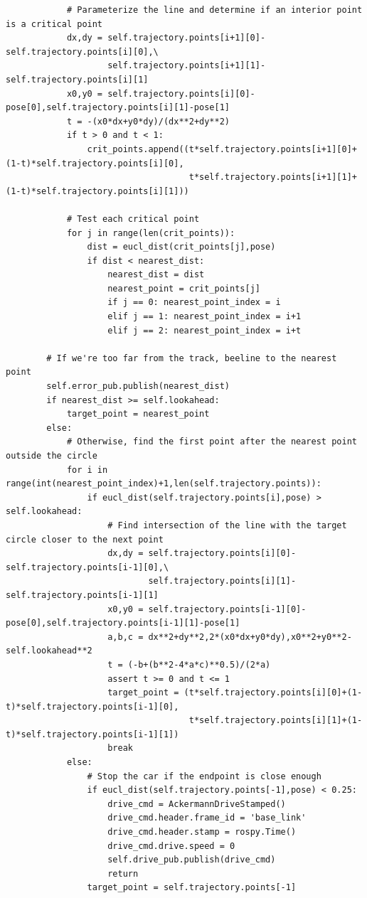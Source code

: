 \documentclass{article}
\begin{document}
{\begin{verbatim}
            # Parameterize the line and determine if an interior point is a critical point
            dx,dy = self.trajectory.points[i+1][0]-self.trajectory.points[i][0],\
                    self.trajectory.points[i+1][1]-self.trajectory.points[i][1]
            x0,y0 = self.trajectory.points[i][0]-pose[0],self.trajectory.points[i][1]-pose[1]
            t = -(x0*dx+y0*dy)/(dx**2+dy**2)
            if t > 0 and t < 1:
                crit_points.append((t*self.trajectory.points[i+1][0]+(1-t)*self.trajectory.points[i][0],
                                    t*self.trajectory.points[i+1][1]+(1-t)*self.trajectory.points[i][1]))
            
            # Test each critical point
            for j in range(len(crit_points)):
                dist = eucl_dist(crit_points[j],pose)
                if dist < nearest_dist:
                    nearest_dist = dist
                    nearest_point = crit_points[j]
                    if j == 0: nearest_point_index = i
                    elif j == 1: nearest_point_index = i+1
                    elif j == 2: nearest_point_index = i+t
        
        # If we're too far from the track, beeline to the nearest point
        self.error_pub.publish(nearest_dist)
        if nearest_dist >= self.lookahead:
            target_point = nearest_point
        else:
            # Otherwise, find the first point after the nearest point outside the circle
            for i in range(int(nearest_point_index)+1,len(self.trajectory.points)):
                if eucl_dist(self.trajectory.points[i],pose) > self.lookahead:
                    # Find intersection of the line with the target circle closer to the next point
                    dx,dy = self.trajectory.points[i][0]-self.trajectory.points[i-1][0],\
                            self.trajectory.points[i][1]-self.trajectory.points[i-1][1]
                    x0,y0 = self.trajectory.points[i-1][0]-pose[0],self.trajectory.points[i-1][1]-pose[1]
                    a,b,c = dx**2+dy**2,2*(x0*dx+y0*dy),x0**2+y0**2-self.lookahead**2
                    t = (-b+(b**2-4*a*c)**0.5)/(2*a)
                    assert t >= 0 and t <= 1
                    target_point = (t*self.trajectory.points[i][0]+(1-t)*self.trajectory.points[i-1][0],
                                    t*self.trajectory.points[i][1]+(1-t)*self.trajectory.points[i-1][1])
                    break
            else:
                # Stop the car if the endpoint is close enough
                if eucl_dist(self.trajectory.points[-1],pose) < 0.25:
                    drive_cmd = AckermannDriveStamped()
                    drive_cmd.header.frame_id = 'base_link'
                    drive_cmd.header.stamp = rospy.Time()
                    drive_cmd.drive.speed = 0
                    self.drive_pub.publish(drive_cmd)
                    return
                target_point = self.trajectory.points[-1]


\end{verbatim}}
\end{document}
